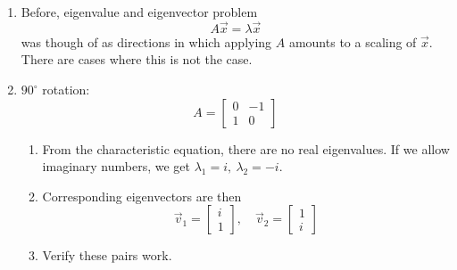 \documentclass{article}
\begin{document}
\begin{enumerate}

\item Before, eigenvalue and eigenvector problem
\[
A\vec{x} = \lambda \vec{x}
\]
was though of as directions in which applying $A$ amounts to a scaling of $\vec{x}$. There are cases where this is not the case.

\item $90^{\circ}$ rotation:
\[
A = \left[
\begin{array}{cc}
0 & -1 \\
1 & 0
\end{array}
\right]
\]
\begin{enumerate}
\item From the characteristic equation, there are no real eigenvalues. If we allow imaginary numbers, we get $\lambda_1 = i, ~ \lambda_2 = -i$. 
\item Corresponding eigenvectors are then
\[
\vec{v}_1 = \left[
\begin{array}{cc}
i \\ 1
\end{array}
\right], \quad
\vec{v}_2 = \left[
\begin{array}{cc}
1 \\ i
\end{array}
\right]
\]
\item Verify these pairs work.
\end{enumerate}


\end{enumerate}
\end{document}
